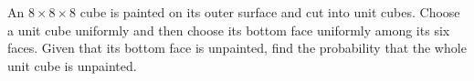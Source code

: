 An $8\times8\times8$ cube is painted on its outer surface and cut into unit cubes. Choose a unit cube uniformly and then choose its bottom face uniformly among its six faces. Given that its bottom face is unpainted, find the probability that the whole unit cube is unpainted.
